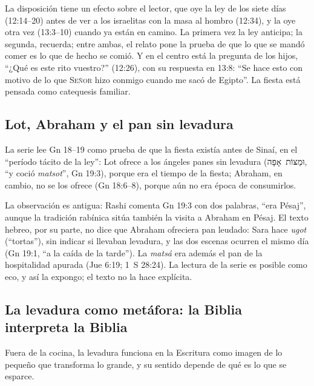 \documentclass[11pt,letterpaper]{article}
\newcommand{\heb}[1]{\mbox{\foreignlanguage{hebrew}{#1}}}
\newcommand{\SENOR}{\textsc{Señor}}
\begin{document}
La disposición tiene un efecto sobre el lector, que oye la ley de los siete días (12:14--20) antes de ver a los israelitas con la masa al hombro (12:34), y la oye otra vez (13:3--10) cuando ya están en camino. La primera vez la ley anticipa; la segunda, recuerda; entre ambas, el relato pone la prueba de que lo que se mandó comer es lo que de hecho se comió. Y en el centro está la pregunta de los hijos, ``¿Qué es este rito vuestro?'' (12:26), con su respuesta en 13:8: ``Se hace esto con motivo de lo que \SENOR{} hizo conmigo cuando me sacó de Egipto''. La fiesta está pensada como catequesis familiar.

\subsection{Lot, Abraham y el pan sin levadura}
La serie lee Gn 18--19 como prueba de que la fiesta existía antes de Sinaí, en el ``período tácito de la ley'': Lot ofrece a los ángeles panes sin levadura (\heb{וּמַצּוֹת אָפָה}, ``y coció \emph{matsot}'', Gn 19:3), porque era el tiempo de la fiesta; Abraham, en cambio, no se los ofrece (Gn 18:6--8), porque aún no era época de consumirlos.

\begin{nota}
La observación es antigua: Rashi comenta Gn 19:3 con dos palabras, ``era Pésaj'', aunque la tradición rabínica sitúa también la visita a Abraham en Pésaj. El texto hebreo, por su parte, no dice que Abraham ofreciera pan leudado: Sara hace \emph{ugot} (``tortas''), sin indicar si llevaban levadura, y las dos escenas ocurren el mismo día (Gn 19:1, ``a la caída de la tarde''). La \emph{matsá} era además el pan de la hospitalidad apurada (Jue 6:19; 1~S 28:24). La lectura de la serie es posible como eco, y así la expongo; el texto no la hace explícita.
\end{nota}

\subsection{La levadura como metáfora: la Biblia interpreta la Biblia}
Fuera de la cocina, la levadura funciona en la Escritura como imagen de lo pequeño que transforma lo grande, y su sentido depende de qué es lo que se esparce.
\end{document}
